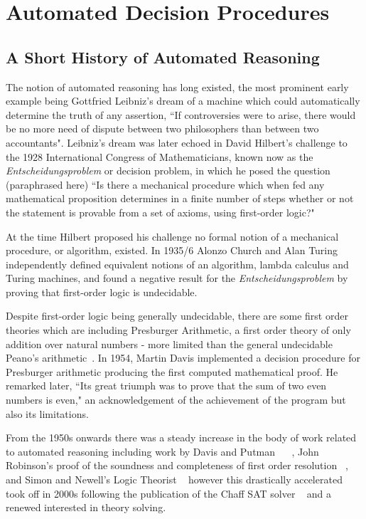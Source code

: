 \documentclass[]{final_report}
\begin{document}
\chapter{Automated Decision Procedures}

\section{A Short History of Automated Reasoning}
The notion of automated reasoning has long existed, the most prominent early example being Gottfried Leibniz's dream of a machine which could automatically determine the truth of any assertion, ``If controversies were to arise, there would be no more need of dispute between two philosophers than between two accountants". Leibniz's dream was later echoed in David Hilbert's challenge to the 1928 International Congress of Mathematicians, known now as the \textit{Entscheidungsproblem} or decision problem, in which he posed the question (paraphrased here) ``Is there a mechanical procedure which when fed any mathematical proposition determines in a finite number of steps whether or not the statement is provable from a set of axioms, using first-order logic?"~\cite{smtwheredowegofromhere}~\cite{automatedreasoningbooklet2004} 

At the time Hilbert proposed his challenge no formal notion of a mechanical procedure, or algorithm, existed. In 1935/6 Alonzo Church and Alan Turing independently defined equivalent notions of an algorithm, lambda calculus and Turing machines, and found a negative result for the \textit{Entscheidungsproblem}  by proving that first-order logic is undecidable.~\cite{turingchurchproof}

Despite first-order logic being generally undecidable, there are some first order theories which are including Presburger Arithmetic, a first order theory of only addition over natural numbers - more limited than the general undecidable Peano's arithmetic~\cite{automatedreasoningbooklet2004}. In 1954, Martin Davis implemented a decision procedure for Presburger arithmetic producing the first computed mathematical proof. He remarked later, ``Its great triumph was to prove that the sum of two even numbers is even," an acknowledgement of the achievement of the program but also its limitations. ~\cite{excapebarrettriseofsmt} ~\cite{automatedreasoningbooklet2004}

From the 1950s onwards there was a steady increase in the body of work related to automated reasoning including work by Davis and Putman ~\cite{Davis:1960:CPQ:321033.321034} ~\cite{Davis:1962:MPT:368273.368557}, John Robinson's proof of the soundness and completeness of first order resolution ~\cite{robinson1965machine}, and Simon and Newell's Logic Theorist ~\cite{newell1956logic} however this drastically accelerated took off in 2000s following the publication of the Chaff SAT solver ~\cite{moskewicz2001chaff} and a renewed interested in theory solving. ~\cite{excapebarrettriseofsmt}
\end{document}
